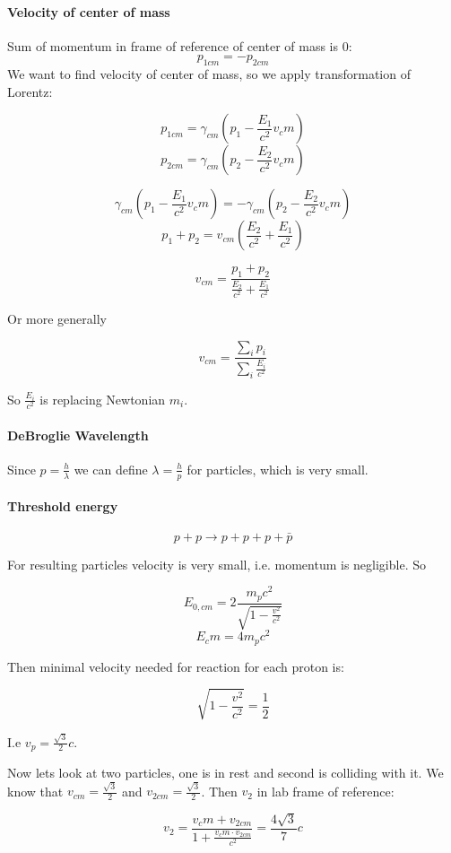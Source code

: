 \paragraph{Velocity of center of mass}
Sum of momentum in frame of reference of center of mass is 0:
$$p_{1cm} = -p_{2cm} $$
We want to find velocity of center of mass, so we apply transformation of Lorentz:

$$p_{1cm}  = \gamma_{cm} \left( p_1 - \frac{E_1}{c^2}v_cm \right)$$
$$p_{2cm}  = \gamma_{cm} \left( p_2 - \frac{E_2}{c^2}v_cm \right)$$


$$ \gamma_{cm} \left( p_1 - \frac{E_1}{c^2}v_cm \right) =  -\gamma_{cm} \left( p_2 - \frac{E_2}{c^2}v_cm \right) $$
$$p_1+p_2 = v_{cm}\left( \frac{E_2}{c^2} + \frac{E_1}{c^2} \right)$$

$$v_{cm} = \frac{p_1+p_2}{\frac{E_2}{c^2} + \frac{E_1}{c^2}}$$

Or more generally

$$v_{cm} = \frac{\sum_i p_i}{\sum_i \frac{E_i}{c^2}}$$

So $\frac{E_i}{c^2}$ is replacing Newtonian $m_i$.

\paragraph{DeBroglie Wavelength}

Since $p=\frac{h}{\lambda}$ we can define $\lambda = \frac{h}{p}$ for particles, which is very small.

\paragraph{Threshold energy}
$$p+p \to p+p+p+\bar{p}$$

For resulting particles velocity is very small, i.e. momentum is negligible. So

$$E_{0,cm} = 2\frac{m_pc^2}{\sqrt{1-\frac{v^2}{c^2}}}$$
$$E_cm = 4m_pc^2$$

Then minimal velocity needed for reaction for each proton is:

$$\sqrt{1-\frac{v^2}{c^2}}= \frac{1}{2}$$

I.e $v_p = \frac{\sqrt{3}}{2}c$.

Now lets look at two particles, one is in rest and second is colliding with it. We know that $v_{cm}= \frac{\sqrt{3}}{2}$ and $v_{2cm} =\frac{\sqrt{3}}{2}$. Then $v_2$ in lab frame of reference:

$$v_2  = \frac{v_cm+v_{2cm}}{1+ \frac{v_cm\cdot v_{2cm}}{c^2}} = \frac{4\sqrt{3}}{7}c$$

